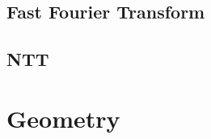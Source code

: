 \documentclass[a4paper,10pt,twocolumn,oneside]{article}
\begin{document}
\subsection{Fast Fourier Transform}


%

%

\subsection{NTT}


%

%


\section{Geometry}
%

%
%
\end{document}
